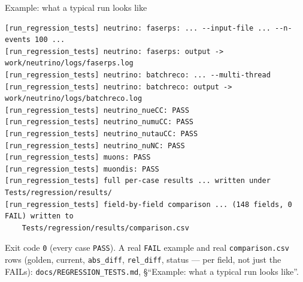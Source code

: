 \documentclass[aspectratio=169]{beamer}
\begin{document}
\begin{frame}[fragile]{Example: what a typical run looks like}
  \scriptsize
\begin{lstlisting}[basicstyle=\ttfamily\tiny]
[run_regression_tests] neutrino: faserps: ... --input-file ... --n-events 100 ...
[run_regression_tests] neutrino: faserps: output -> work/neutrino/logs/faserps.log
[run_regression_tests] neutrino: batchreco: ... --multi-thread
[run_regression_tests] neutrino: batchreco: output -> work/neutrino/logs/batchreco.log
[run_regression_tests] neutrino_nueCC: PASS
[run_regression_tests] neutrino_numuCC: PASS
[run_regression_tests] neutrino_nutauCC: PASS
[run_regression_tests] neutrino_nuNC: PASS
[run_regression_tests] muons: PASS
[run_regression_tests] muondis: PASS
[run_regression_tests] full per-case results ... written under Tests/regression/results/
[run_regression_tests] field-by-field comparison ... (148 fields, 0 FAIL) written to
    Tests/regression/results/comparison.csv
\end{lstlisting}
  Exit code \texttt{0} (every case \texttt{PASS}). A real \texttt{FAIL}
  example and real \texttt{comparison.csv} rows (golden, current,
  \texttt{abs\_diff}, \texttt{rel\_diff}, status --- per field, not just
  the FAILs): \texttt{docs/REGRESSION\_TESTS.md}, \S``Example: what a
  typical run looks like''.
\end{frame}
\end{document}
